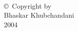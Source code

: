 
\thispagestyle{empty}
\hbox{\ }

\vfill
\renewcommand{\baselinestretch}{1}
\small\normalsize

\vspace{.5in}

\begin{center}
\large{\copyright \hbox{ }Copyright by\\
Bhaskar Khubchandani  %
\\
2004}
\end{center}

\vfill

\newpage 

